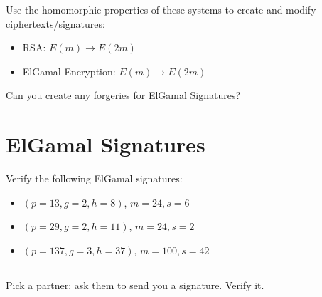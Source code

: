 \documentclass[12pt]{article}
\begin{document}
Use the homomorphic properties of these systems to create and modify ciphertexts/signatures:

\begin{itemize}
\item RSA: $E(m) \to E(2m)$
\item ElGamal Encryption: $E(m) \to E(2m)$
\end{itemize}

Can you create any  forgeries for ElGamal Signatures?

\section{ElGamal Signatures}

Verify the following ElGamal signatures:

\begin{itemize}
\item $(p = 13, g = 2, h=8)$,  $m = 24, s = 6$
\item $(p = 29, g = 2, h=11)$, $m = 24, s = 2$
\item $(p = 137, g = 3, h=37)$, $m = 100, s = 42$
\end{itemize}

\subsection{}

Pick a partner; ask them to send you a signature. Verify it.
\end{document}

